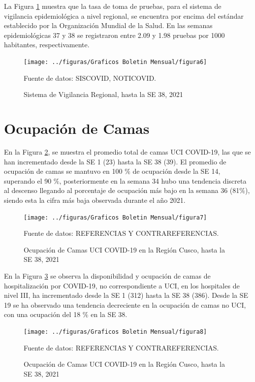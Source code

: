 \documentclass[12pt,a4paper,openany]{book}
\begin{document}
	\noindent La Figura \ref{fig:vigilancia_regional} muestra que la tasa de toma de pruebas, para el sistema de vigilancia epidemiológica a nivel regional, se encuentra por encima del estándar establecido por la Organización Mundial de la Salud. En las semanas epidemiológicas 37 y 38 se registraron entre 2.09 y 1.98 pruebas por 1000 habitantes, respectivamente.
	
	\begin{figure}[h]
	\caption{Sistema de Vigilancia Regional, hasta la SE 38, 2021 }\label{fig:vigilancia_regional}
	\begin{center}
		\texttt{[image: ../figuras/Graficos Boletin Mensual/figura6]}
	\end{center}
	{\footnotesize {Fuente de datos: SISCOVID, NOTICOVID.}}
	\end{figure}

	\section*{Ocupación de Camas}
	\noindent En la Figura \ref{fig:ocupacion_uci}, se muestra el promedio total de camas UCI COVID-19, las que se han incrementado desde la SE 1 (23) hasta la SE 38 (39). El promedio de ocupación de camas se mantuvo en 100 $\%$ de ocupación desde la SE 14, superando el 90 $\%$, posteriormente en la semana 34 hubo una tendencia discreta al descenso llegando al porcentaje de ocupación más bajo en la semana 36 (81$\%$), siendo esta la cifra más baja observada durante el año 2021.
	
	\begin{figure}[h]
	\caption{Ocupación de Camas UCI COVID-19 en la Región Cusco, hasta la SE 38, 2021}\label{fig:ocupacion_uci}
	\begin{center}
		\texttt{[image: ../figuras/Graficos Boletin Mensual/figura7]}
	\end{center}
	{\footnotesize {Fuente de datos: REFERENCIAS Y CONTRAREFERENCIAS.}}
	\end{figure}

	En la Figura \ref{fig:ocupacion_3_nivel} se observa la disponibilidad y ocupación de camas de hospitalización por COVID-19, no correspondiente a UCI, en los hospitales de nivel III, ha incrementado desde la SE 1 (312) hasta la SE 38 (386). Desde la SE 19 se ha observado una tendencia decreciente en la ocupación de camas no UCI, con una ocupación del 18 $\%$ en la SE 38.
	
	\begin{figure}[h]
	\caption{Ocupación de Camas UCI COVID-19 en la Región Cusco, hasta la SE 38, 2021}\label{fig:ocupacion_3_nivel}
	\begin{center}
		\texttt{[image: ../figuras/Graficos Boletin Mensual/figura8]}
	\end{center}
	{\footnotesize {Fuente de datos: REFERENCIAS Y CONTRAREFERENCIAS.}}
	\end{figure}
\end{document}
